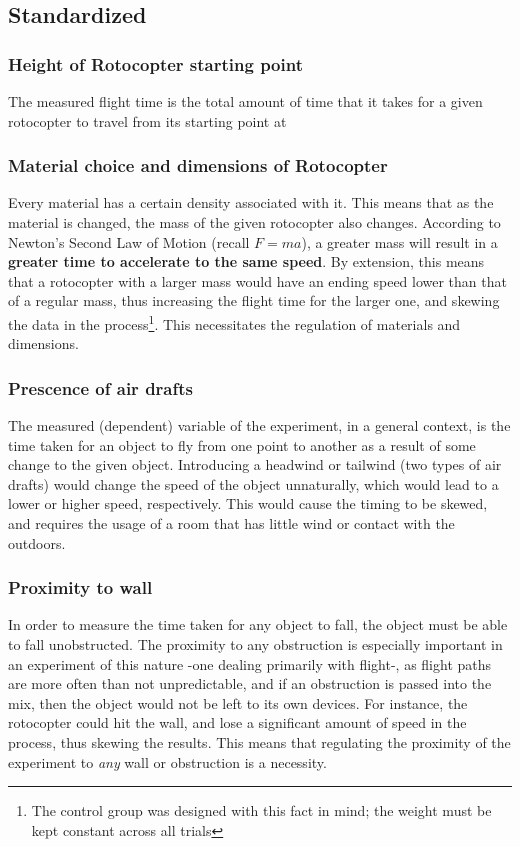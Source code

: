 \documentclass[]{article}
\theoremstyle{definition}
\begin{document}
\subsection{Standardized}

\subsubsection{Height of Rotocopter starting point}
The measured flight time is the total amount of time that it takes for a given rotocopter to travel from its starting point at 

\subsubsection{Material choice and dimensions of Rotocopter}
Every material has a certain density associated with it. This means that as the material is changed, the mass of the given rotocopter also changes. According to Newton's Second Law of Motion (recall $F=ma$), a greater mass will result in a \textbf{greater time to accelerate to the same speed}. By extension, this means that a rotocopter with a larger mass would have an ending speed lower than that of a regular mass, thus increasing the flight time for the larger one, and skewing the data in the process\footnote{The control group was designed with this fact in mind; the weight must be kept constant across all trials}. This necessitates the regulation of materials and dimensions.

\subsubsection{Prescence of air drafts}
The measured (dependent) variable of the experiment, in a general context, is the time taken for an object to fly from one point to another as a result of some change to the given object. Introducing a headwind or tailwind (two types of air drafts) would change the speed of the object unnaturally, which would lead to a lower or higher speed, respectively. This would cause the timing to be skewed, and requires the usage of a room that has little wind or contact with the outdoors.

\subsubsection{Proximity to wall}
In order to measure the time taken for any object to fall, the object must be able to fall unobstructed. The proximity to any obstruction is especially important in an experiment of this nature -one dealing primarily with flight-, as flight paths are more often than not unpredictable, and if an obstruction is passed into the mix, then the object would not be left to its own devices. For instance, the rotocopter could hit the wall, and lose a significant amount of speed in the process, thus skewing the results. This means that regulating the proximity of the experiment to \textit{any} wall or obstruction is a necessity.
\end{document}
